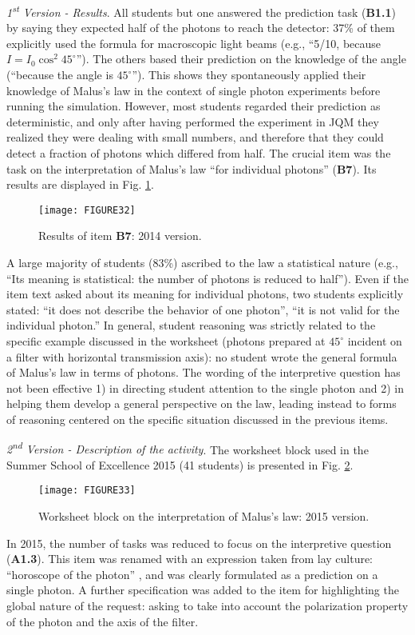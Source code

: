 \documentclass[twocolumn,secnumarabic,amssymb, nobibnotes, aps, prd, nofootinbib]{revtex4-2}
\begin{document}
\emph{1\textsuperscript{st} Version - Results}. All students but one answered the prediction task (\textbf{B1.1}) by saying they expected half of the photons to reach the detector: 37\% of them explicitly used the formula for macroscopic light beams (e.g., ``5/10, because $I=I_0\cos^2{45^{\circ}}$''). The others based their prediction on the knowledge of the angle (``because the angle is $45^{\circ}$''). This shows they spontaneously applied their knowledge of Malus's law in the context of single photon experiments before running the simulation. However, most students regarded their prediction as deterministic, and only after having performed the experiment in JQM they realized they were dealing with small numbers, and therefore that they could detect a fraction of photons which differed from half. The crucial item was the task on the interpretation of Malus's law ``for individual photons'' (\textbf{B7}). Its results are displayed in Fig. \ref{FIG:32}.
\begin{figure}[!htpb]
       \texttt{[image: FIGURE32]}
    \caption{Results of item \textbf{B7}: 2014 version.}
    \label{FIG:32}
\end{figure}
A large majority of students (83\%) ascribed to the law a statistical nature (e.g., ``Its meaning is statistical: the number of photons is reduced to half''). Even if the item text asked about its meaning for individual photons, two students explicitly stated: ``it does not describe the behavior of one photon'', ``it is not valid for the individual photon.'' In general, student reasoning was strictly related to the specific example discussed in the worksheet (photons prepared at $45^{\circ}$ incident on a filter with horizontal transmission axis): no student wrote the general formula of Malus's law in terms of photons. The wording of the interpretive question has not been effective 1) in directing student attention to the single photon and 2) in helping them develop a general perspective on the law, leading instead to forms of reasoning centered on the specific situation discussed in the previous items.

\emph{2\textsuperscript{nd} Version - Description of the activity}. The worksheet block used in the Summer School of Excellence 2015 (41 students) is presented in Fig. \ref{FIG:33}.
\begin{figure}[!htpb]
       \texttt{[image: FIGURE33]}
    \caption{Worksheet block on the interpretation of Malus's law: 2015 version.}
    \label{FIG:33}
\end{figure}
In 2015, the number of tasks was reduced to focus on the interpretive question (\textbf{A1.3}). This item was renamed with an expression taken from lay culture: ``horoscope of the photon'' , and was clearly formulated as a prediction on a single photon. A further specification was added to the item for highlighting the global nature of the request: asking to take into account the polarization property of the photon and the axis of the filter.
\end{document}

